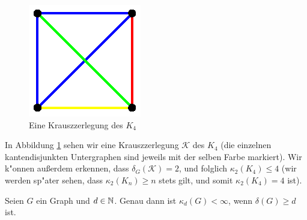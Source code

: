 \begin{example}
  \begin{figure}[htb]
    \centering
    \includegraphics{images/krauszzerlegungk4.eps}
    \caption{Eine Krauszzerlegung des $K_4$}
    \label{fig:KrauszzerlegungK4}
  \end{figure}
  In Abbildung \ref{fig:KrauszzerlegungK4} sehen wir eine Krauszzerlegung $\mathcal{K}$ des $K_4$ (die einzelnen kantendisjunkten Untergraphen sind jeweils mit der selben Farbe markiert). Wir k"onnen au{\ss}erdem erkennen, dass $\delta_{G}(\mathcal{K}) = 2$, und folglich $\kappa_{2}(K_4) \leq 4$ (wir werden sp"ater sehen, dass $\kappa_{2}(K_n) \geq n$ stets gilt, und somit $\kappa_{2}(K_{4}) = 4$ ist). 
\end{example}
\begin{lemma}
  Seien $G$ ein Graph und $d\in {\mathbb{N}}$. Genau dann ist $\kappa_{d}(G) < \infty$, wenn $\delta(G) \geq d$ ist. 
  \label{lm:krauszexistenz}

\end{lemma}

